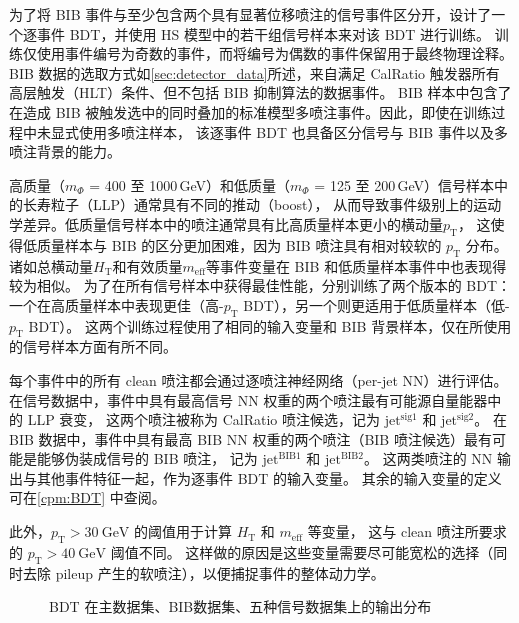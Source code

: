 为了将 BIB 事件与至少包含两个具有显著位移喷注的信号事件区分开，设计了一个逐事件 BDT，并使用 HS 模型中的若干组信号样本来对该 BDT 进行训练。
训练仅使用事件编号为奇数的事件，而将编号为偶数的事件保留用于最终物理诠释。
BIB 数据的选取方式如\autoref{sec:detector_data}所述，来自满足 CalRatio 触发器所有高层触发（HLT）条件、但不包括 BIB 抑制算法的数据事件。
BIB 样本中包含了在造成 BIB 被触发选中的同时叠加的标准模型多喷注事件。因此，即使在训练过程中未显式使用多喷注样本，
该逐事件 BDT 也具备区分信号与 BIB 事件以及多喷注背景的能力。

高质量（$m_\Phi$ = 400 至 1000\,GeV）和低质量（$m_\Phi$ = 125 至 200\,GeV）信号样本中的长寿粒子（LLP）通常具有不同的推动（boost），
从而导致事件级别上的运动学差异。低质量信号样本中的喷注通常具有比高质量样本更小的横动量$p_\mathrm{T}$，
这使得低质量样本与 BIB 的区分更加困难，因为 BIB 喷注具有相对较软的 $p_\mathrm{T}$ 分布。
诸如总横动量$H_\mathrm{T}$和有效质量$m_\mathrm{eff}$等事件变量在 BIB 和低质量样本事件中也表现得较为相似。
为了在所有信号样本中获得最佳性能，分别训练了两个版本的 BDT：
一个在高质量样本中表现更佳（高-$p_\mathrm{T}$ BDT），另一个则更适用于低质量样本（低-$p_\mathrm{T}$ BDT）。
这两个训练过程使用了相同的输入变量和 BIB 背景样本，仅在所使用的信号样本方面有所不同。

每个事件中的所有 clean 喷注都会通过逐喷注神经网络（per-jet NN）进行评估。
在信号数据中，事件中具有最高信号 NN 权重的两个喷注最有可能源自量能器中的 LLP 衰变，
这两个喷注被称为 CalRatio 喷注候选，记为 $\text{jet}^{\text{sig1}}$ 和 $\text{jet}^{\text{sig2}}$。
在 BIB 数据中，事件中具有最高 BIB NN 权重的两个喷注（BIB 喷注候选）最有可能是能够伪装成信号的 BIB 喷注，
记为 $\text{jet}^{\text{BIB}1}$ 和 $\text{jet}^{\text{BIB}2}$。
这两类喷注的 NN 输出与其他事件特征一起，作为逐事件 BDT 的输入变量。
其余的输入变量的定义可在\autoref{cpm:BDT} 中查阅。

此外，$p_\mathrm{T} > 30~\text{GeV}$ 的阈值用于计算 $H_\mathrm{T}$ 和 $m_\mathrm{eff}$ 等变量，
这与 clean 喷注所要求的 $p_\mathrm{T} > 40~\text{GeV}$ 阈值不同。
这样做的原因是这些变量需要尽可能宽松的选择（同时去除 pileup 产生的软喷注），以便捕捉事件的整体动力学。

\begin{figure}[ht]
    \centering
    \hfill
    \caption{BDT 在主数据集、BIB数据集、五种信号数据集上的输出分布}
    \label{fig:BDT}
\end{figure}

